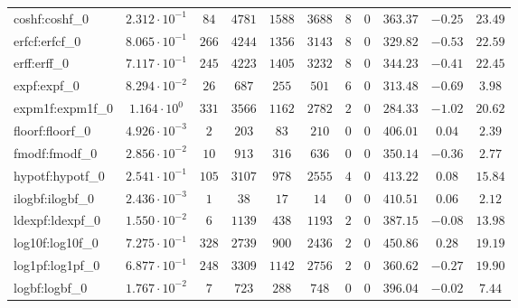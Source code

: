 \begin{tabular}{|l|c|c|c|c|c|c|c|c|c|c|}
coshf:coshf\_0               & $ 2.312 \cdot 10^{-1} $ & $ 84     $ & $ 4781  $ & $ 1588  $ & $ 3688  $ & $ 8   $ & $ 0 $ & $ 363.37      $ & $ -0.25   $ & $ 23.49   $ \\
erfcf:erfcf\_0               & $ 8.065 \cdot 10^{-1} $ & $ 266    $ & $ 4244  $ & $ 1356  $ & $ 3143  $ & $ 8   $ & $ 0 $ & $ 329.82      $ & $ -0.53   $ & $ 22.59   $ \\
erff:erff\_0                 & $ 7.117 \cdot 10^{-1} $ & $ 245    $ & $ 4223  $ & $ 1405  $ & $ 3232  $ & $ 8   $ & $ 0 $ & $ 344.23      $ & $ -0.41   $ & $ 22.45   $ \\
expf:expf\_0                 & $ 8.294 \cdot 10^{-2} $ & $ 26     $ & $ 687   $ & $ 255   $ & $ 501   $ & $ 6   $ & $ 0 $ & $ 313.48      $ & $ -0.69   $ & $ 3.98    $ \\
expm1f:expm1f\_0             & $ 1.164 \cdot 10^{0}  $ & $ 331    $ & $ 3566  $ & $ 1162  $ & $ 2782  $ & $ 2   $ & $ 0 $ & $ 284.33      $ & $ -1.02   $ & $ 20.62   $ \\
floorf:floorf\_0             & $ 4.926 \cdot 10^{-3} $ & $ 2      $ & $ 203   $ & $ 83    $ & $ 210   $ & $ 0   $ & $ 0 $ & $ 406.01      $ & $ 0.04    $ & $ 2.39    $ \\
fmodf:fmodf\_0               & $ 2.856 \cdot 10^{-2} $ & $ 10     $ & $ 913   $ & $ 316   $ & $ 636   $ & $ 0   $ & $ 0 $ & $ 350.14      $ & $ -0.36   $ & $ 2.77    $ \\
hypotf:hypotf\_0             & $ 2.541 \cdot 10^{-1} $ & $ 105    $ & $ 3107  $ & $ 978   $ & $ 2555  $ & $ 4   $ & $ 0 $ & $ 413.22      $ & $ 0.08    $ & $ 15.84   $ \\
ilogbf:ilogbf\_0             & $ 2.436 \cdot 10^{-3} $ & $ 1      $ & $ 38    $ & $ 17    $ & $ 14    $ & $ 0   $ & $ 0 $ & $ 410.51      $ & $ 0.06    $ & $ 2.12    $ \\
ldexpf:ldexpf\_0             & $ 1.550 \cdot 10^{-2} $ & $ 6      $ & $ 1139  $ & $ 438   $ & $ 1193  $ & $ 2   $ & $ 0 $ & $ 387.15      $ & $ -0.08   $ & $ 13.98   $ \\
log10f:log10f\_0             & $ 7.275 \cdot 10^{-1} $ & $ 328    $ & $ 2739  $ & $ 900   $ & $ 2436  $ & $ 2   $ & $ 0 $ & $ 450.86      $ & $ 0.28    $ & $ 19.19   $ \\
log1pf:log1pf\_0             & $ 6.877 \cdot 10^{-1} $ & $ 248    $ & $ 3309  $ & $ 1142  $ & $ 2756  $ & $ 2   $ & $ 0 $ & $ 360.62      $ & $ -0.27   $ & $ 19.90   $ \\
logbf:logbf\_0               & $ 1.767 \cdot 10^{-2} $ & $ 7      $ & $ 723   $ & $ 288   $ & $ 748   $ & $ 0   $ & $ 0 $ & $ 396.04      $ & $ -0.02   $ & $ 7.44    $ \\

\end{tabular}
